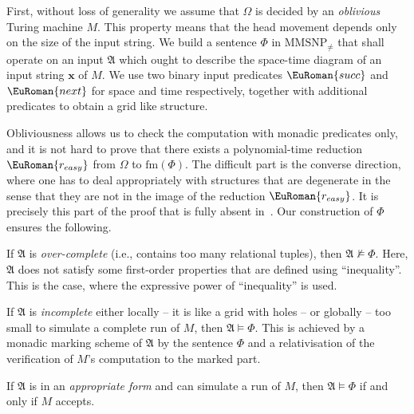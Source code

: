 \documentclass[10pt,a4paper]{amsart}
\theoremstyle{plain}
\theoremstyle{definition}
\numberwithin{equation}{section}
\newcommand{\eurm}[1]{\EuRoman{#1}} %
\newcommand{\ie}{i.e.\xspace}  %
\newcommand{\structure}[1]{\mathfrak{#1}} %
\newcommand{\tuple}[1]{\mathbf{#1}} %
\newcommand{\rel}[1]{\eurm{#1}} %
\newcommand{\func}[1]{\eurm{#1}}  %
\newcommand{\Sat}[0]{\ensuremath{\mathrm{fm}}}
\newcommand{\MMSNPineq}[0]{\ensuremath{\textrm{MMSNP}_{\not=}}}
\begin{document}
First, without loss of generality we assume that $\Omega$ is decided by an \emph{oblivious} Turing machine $M$. 
%
This property means that the head movement depends only on the size of the input string.  
%
We build a sentence $\Phi$ in $\MMSNPineq$ that shall operate on an input $\structure{A}$ which ought to describe the space-time diagram of an input string $\tuple{x}$ of $M$. 
%
We use two binary input predicates $\rel{succ}$ and $\rel{next}$ for space and time respectively, together with additional predicates to obtain a grid like structure.



Obliviousness allows us to check the computation with monadic predicates only, and it is not hard to prove that there exists a polynomial-time reduction $\func{r_{easy}}$ from $\Omega$ to $\Sat(\Phi)$.
%
The difficult part is the converse direction, where one has to deal appropriately with structures that are degenerate in the sense that they are not in the image of the reduction $\func{r_{easy}}$.
%
It is precisely this part of the proof that is fully absent in~\cite{federvardi1998}. 
%
Our construction of $\Phi$ ensures the following.
\begin{compactitem}
\item If $\structure{A}$ is \emph{over-complete} (\ie, contains too many relational tuples), then $\structure{A}\not\models\Phi$. Here, $\structure{A}$ does not satisfy some first-order properties that are defined using ``inequality''. This is the case, where the expressive power of ``inequality'' is used.
\item If $\structure{A}$ is \emph{incomplete} either locally -- it is like a grid with holes -- or globally -- too small to simulate a complete run of $M$, then $\structure{A}\models\Phi$. This is achieved by a monadic marking scheme of $\structure{A}$ by the sentence $\Phi$ and a relativisation of the verification of $M$'s computation to the marked part.
\item If $\structure{A}$ is in an \emph{appropriate form} and can simulate a run of $M$, then $\structure{A}\models\Phi$ if and only if $M$ accepts.
\end{compactitem}
\end{document}
